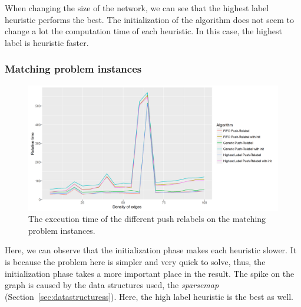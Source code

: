 When changing the size of the network, we can see that the highest label heuristic performs the best. The initialization of the algorithm does not seem to change a lot the computation time of each heuristic. In this case, the highest label is heuristic faster.


\subsubsection{Matching problem instances}
\begin{figure}[H]
\begin{center}
\includegraphics[scale=0.54]{images/meanmatchingpr.png}
\caption{The execution time of the different push relabels on the matching problem instances.}
\label{fig:mean_matching_pr}
\end{center}
\end{figure}

Here, we can observe that the initialization phase makes each heuristic slower. It is because the problem here is simpler and very quick to solve, thus, the initialization phase takes a more important place in the result. The spike on the graph is caused by the data structures used, the \textit{sparsemap} (Section~\ref{sec:datastructuress}). Here, the high label heuristic is the best as well.


